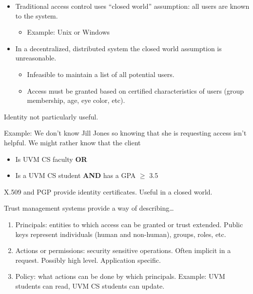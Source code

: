 \documentclass[landscape]{slides}
\begin{document}
\begin{itemize}

\item Traditional access control uses ``closed world'' assumption: all users are known to the system.

  \begin{itemize}
  \item Example: Unix or Windows
  \end{itemize}

\item In a decentralized, distributed system the closed world assumption is unreasonable.

	\begin{itemize}
	\item Infeasible to maintain a list of all potential users.
  \item Access must be granted based on certified characteristics of users (group membership, age, eye color, etc).
  \end{itemize}

\end{itemize}
\stopslide



Identity not particularly useful.

Example: We don't know Jill Jones so knowing that she is requesting access isn't helpful.
We might rather know that the client

\begin{itemize}
\item Is UVM CS faculty \textbf{OR}
\item Is a UVM CS student \textbf{AND} has a GPA $\ge$ 3.5
\end{itemize}

X.509 and PGP provide identity certificates. Useful in a closed world.
\stopslide



Trust management systems provide a way of describing\ldots

\begin{enumerate}

\item Principals: entities to which access can be granted or trust extended. Public keys represent individuals (human and non-human), groups, roles, etc.

\item Actions or permissions: security sensitive operations. Often implicit in a request. Possibly high level. Application specific.

\item Policy: what actions can be done by which principals. Example: UVM students can read, UVM CS students can update.

\end{enumerate}
\end{document}
